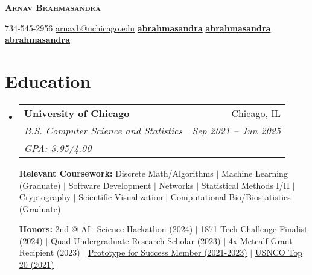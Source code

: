 \documentclass[letterpaper,11pt]{article}
\makeatletter
\newcommand{\phonesymbol}{\faPhone}
\newcommand{\homepagesymbol}{\faChain}
\newcommand{\linkedinsymbol}{\faLinkedin}
\newcommand{\githubsymbol}{\faGithub}
\newcommand{\mailsymbol}{\faEnvelope}
\newcommand{\printinfo}[2]{\mbox{{#1}\hspace{0.5em}#2\hspace{0.5em}}}
\newcommand{\mailaddress}[1]{\printinfo{\mailsymbol}{#1}}
\newcommand{\phone}[1]{\printinfo{\phonesymbol}{#1}}
\newcommand{\homepage}[1]{\printinfo{\homepagesymbol}{#1}}
\newcommand{\linkedin}[1]{\printinfo{\linkedinsymbol}{#1}}
\newcommand{\github}[1]{\printinfo{\githubsymbol}{#1}}
\newcommand{\courseItem}[1]{
    {\small #1 \vspace{-2pt}}
}
\newcommand{\honorsItem}[1]{
    {\small #1 \vspace{-2pt}}
}
\newcommand{\resumeEduSubheading}[5]{
  \vspace{-2pt}\item
    \begin{tabular*}{0.97\textwidth}[t]{l@{\extracolsep{\fill}}r}
      \textbf{#1} & #2 \\
      \textit{\small#3} & \textit{\small #4} \\
      \textit{\small#5}
    \end{tabular*}\vspace{-7pt}
}
\newcommand{\resumeSubHeadingListStart}{\begin{itemize}[leftmargin=0.15in, label={}]}
\newcommand{\resumeSubHeadingListEnd}{\end{itemize}}
\makeatother
\begin{document}

\begin{center}
    \textbf{\Huge \scshape Arnav Brahmasandra} \\ \vspace{1pt}
    
    \phone{734-545-2956} 
    \mailaddress{\href{mailto:arnavb@uchicago.edu}{arnavb@uchicago.edu}}
    \linkedin{\href{https://www.linkedin.com/in/abrahmasandra/}{\textbf{abrahmasandra}}}
    \github{\href{https://github.com/abrahmasandra}{\textbf{abrahmasandra}}}
    \homepage{\href{https://abrahmasandra.github.io/}{\textbf{abrahmasandra}}}
\end{center}


\section{Education}
  \resumeSubHeadingListStart
    \resumeEduSubheading
      {University of Chicago}{Chicago, IL}
      {B.S. Computer Science and Statistics}{Sep 2021 -- Jun 2025}{GPA: 3.95/4.00} \newline

    \textbf{Relevant Coursework:} \courseItem{Discrete Math/Algorithms $|$ Machine Learning (Graduate) $|$ Software Development $|$ Networks $|$ Statistical Methods I/II $|$ Cryptography $|$ Scientific Visualization $|$ Computational Bio/Biostatistics (Graduate)}
    
    \textbf{Honors:} \honorsItem{2nd @ AI+Science Hackathon (2024) $|$ 1871 Tech Challenge Finalist (2024) $|$ \href{https://ugradresearchsymposium.omeka.net/items/show/120}{Quad Undergraduate Research Scholar (2023)} $|$ 4x Metcalf Grant Recipient (2023) $|$ \href{https://careeradvancement.uchicago.edu/careers-in/engineering/prototype-for-success/class-of-2025}{Prototype for Success Member (2021-2023)} $|$ \href{https://www.acs.org/content/acs/en/pressroom/newsreleases/2021/may/2021-chemistry-olympiad-virtual-study-camp-students-named.html}{USNCO Top 20 (2021)}}
  \resumeSubHeadingListEnd
\end{document}
